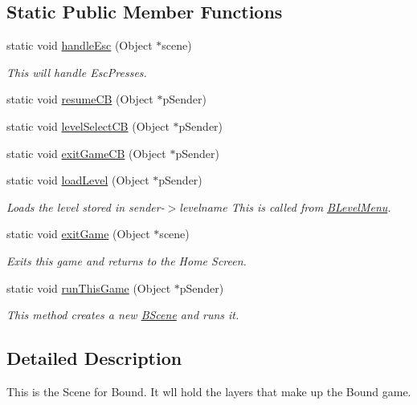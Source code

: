 \subsection*{\-Static \-Public \-Member \-Functions}
\begin{DoxyCompactItemize}
\item 
static void \hyperlink{class_b_scene_aa3e76c81d0eeadf1c6b6f7d9560c14cf}{handle\-Esc} (\-Object $\ast$scene)
\begin{DoxyCompactList}\small\item\em \-This will handle \-Esc\-Presses. \end{DoxyCompactList}\item 
static void \hyperlink{class_b_scene_af600788366f63a8954b892fdc7934236}{resume\-C\-B} (\-Object $\ast$p\-Sender)
\item 
static void \hyperlink{class_b_scene_a21e02f1209ed73a1dfbcada5f153a3b4}{level\-Select\-C\-B} (\-Object $\ast$p\-Sender)
\item 
static void \hyperlink{class_b_scene_a2cef71e8f1d699acc111ea43b872e050}{exit\-Game\-C\-B} (\-Object $\ast$p\-Sender)
\item 
static void \hyperlink{class_b_scene_a43226267f8e0d11e0440d64db1814889}{load\-Level} (\-Object $\ast$p\-Sender)
\begin{DoxyCompactList}\small\item\em \-Loads the level stored in sender-\/$>$levelname \-This is called from \hyperlink{class_b_level_menu}{\-B\-Level\-Menu}. \end{DoxyCompactList}\item 
static void \hyperlink{class_b_scene_a9b647ad2b4ebc0289a3170009653c41d}{exit\-Game} (\-Object $\ast$scene)
\begin{DoxyCompactList}\small\item\em \-Exits this game and returns to the \-Home \-Screen. \end{DoxyCompactList}\item 
static void \hyperlink{class_b_scene_a90db09771569a058108341368724efc9}{run\-This\-Game} (\-Object $\ast$p\-Sender)
\begin{DoxyCompactList}\small\item\em \-This method creates a new \hyperlink{class_b_scene}{\-B\-Scene} and runs it. \end{DoxyCompactList}\end{DoxyCompactItemize}


\subsection{\-Detailed \-Description}
\-This is the \-Scene for \-Bound. \-It wll hold the layers that make up the \-Bound game. 

